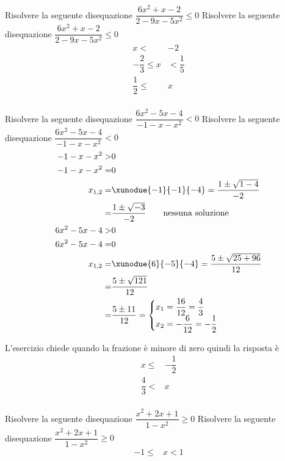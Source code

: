 \begin{exercise}
	Risolvere la seguente disequazione $\dfrac{6x^2+x-2}{2-9x-5x^2}\leq 0$
\tcblower
Risolvere la seguente disequazione $\dfrac{6x^2+x-2}{2-9x-5x^2}\leq 0$
\begin{align*}
x<& -2\\ -\dfrac{2}{3}\leq x&< \dfrac{1}{5}\\ \dfrac{1}{2}\leq&x\\
\end{align*}
\end{exercise}
\begin{exercise}
		Risolvere la seguente disequazione $\dfrac{6x^2-5x-4}{-1-x-x^2}< 0$
	\tcblower
	Risolvere la seguente disequazione $\dfrac{6x^2-5x-4}{-1-x-x^2}< 0$
\begin{align*}
-1-x-x^2>&0\\
-1-x-x^2=&0\\
x_{1,2}=&\xunodue{-1}{-1}{-4}=\dfrac{1\pm\sqrt{1-4}}{-2}\\
=&\dfrac{1\pm\sqrt{-3}}{-2}
\qquad\text{nessuna soluzione}\\
6x^2-5x-4>&0\\
6x^2-5x-4=&0\\
x_{1,2}=&\xunodue{6}{-5}{-4}=\dfrac{5\pm\sqrt{25+96}}{12}\\
=&\dfrac{5\pm\sqrt{121}}{12}\\
=&\dfrac{5\pm 11}{12}=\begin{cases}
x_1=\dfrac{16}{12}=\dfrac{4}{3}\\
x_2=-\dfrac{6}{12}=-\dfrac{1}{2}
\end{cases}\\
\end{align*}
\begin{center}
	
\end{center}
L'esercizio chiede quando la frazione è minore di zero quindi la risposta è 
\begin{align*}
x\leq& -\dfrac{1}{2}\\  \dfrac{4}{3}<&x\\
\end{align*}
\end{exercise}
\begin{exercise}
		Risolvere la seguente disequazione $\dfrac{x^2+2x+1}{1-x^2}\geq 0$
		\tcblower
		Risolvere la seguente disequazione $\dfrac{x^2+2x+1}{1-x^2}\geq 0$
	\begin{align*}
-1\leq& x<1\\
	\end{align*}
\end{exercise}
